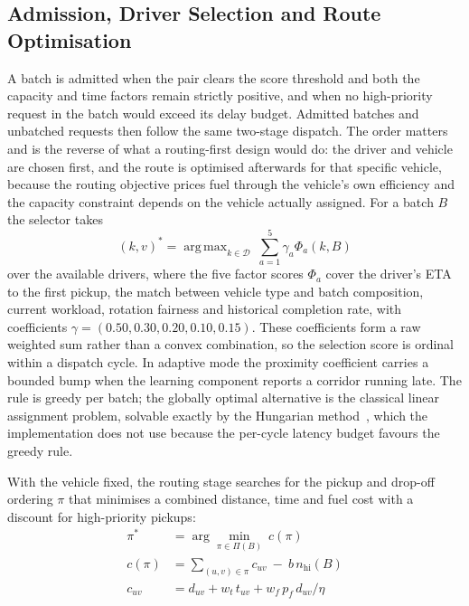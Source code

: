 \documentclass[conference]{IEEEtran}
\DeclareMathOperator*{\argmax}{arg\,max}
\begin{document}
\subsection{Admission, Driver Selection and Route Optimisation}
A batch is admitted when the pair clears the score threshold and both the capacity and time factors remain strictly positive, and when no high-priority request in the batch would exceed its delay budget. Admitted batches and unbatched requests then follow the same two-stage dispatch. The order matters and is the reverse of what a routing-first design would do: the driver and vehicle are chosen first, and the route is optimised afterwards for that specific vehicle, because the routing objective prices fuel through the vehicle's own efficiency and the capacity constraint depends on the vehicle actually assigned. For a batch $B$ the selector takes
\begin{equation}
(k, v)^* = \argmax_{k \in \mathcal{D}} \: \sum_{a=1}^5 \gamma_a \Phi_a(k, B)
\end{equation}
over the available drivers, where the five factor scores $\Phi_a$ cover the driver's ETA to the first pickup, the match between vehicle type and batch composition, current workload, rotation fairness and historical completion rate, with coefficients $\gamma = (0.50, 0.30, 0.20, 0.10, 0.15)$. These coefficients form a raw weighted sum rather than a convex combination, so the selection score is ordinal within a dispatch cycle. In adaptive mode the proximity coefficient carries a bounded bump when the learning component reports a corridor running late. The rule is greedy per batch; the globally optimal alternative is the classical linear assignment problem, solvable exactly by the Hungarian method~\cite{ref12}, which the implementation does not use because the per-cycle latency budget favours the greedy rule.

With the vehicle fixed, the routing stage searches for the pickup and drop-off ordering $\pi$ that minimises a combined distance, time and fuel cost with a discount for high-priority pickups:
\begin{equation}
\begin{aligned}
\pi^* &= \arg\min_{\pi \in \Pi(B)} \: c(\pi) \\
c(\pi) &= {\sum}_{(u,v) \in \pi} c_{uv} \: - \: b \, n_{\text{hi}}(B) \\
c_{uv} &= d_{uv} + w_t \, t_{uv} + w_f \, p_f \, d_{uv} / \eta
\end{aligned}
\end{equation}
\end{document}
